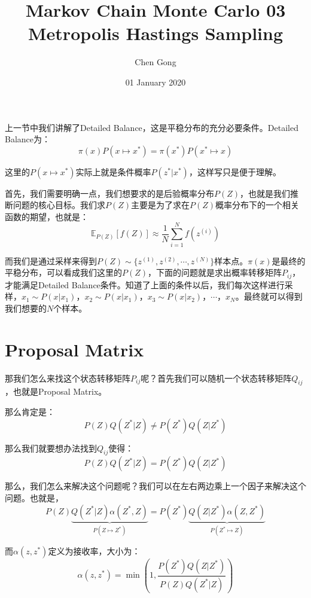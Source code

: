 \documentclass[a4paper]{article}
\title{Markov Chain Monte Carlo 03 Metropolis Hastings Sampling}
\author{Chen Gong}
\date{01 January 2020}
\begin{document}
\maketitle
上一节中我们讲解了Detailed Balance，这是平稳分布的充分必要条件。Detailed Balance为：
\begin{equation}
    \pi(x)P(x\mapsto x^\ast) = \pi(x^\ast)P(x^\ast \mapsto x)
\end{equation}

这里的$P(x\mapsto x^\ast)$实际上就是条件概率$P(z^\ast|x^\ast)$，这样写只是便于理解。

首先，我们需要明确一点，我们想要求的是后验概率分布$P(Z)$，也就是我们推断问题的核心目标。我们求$P(Z)$主要是为了求在$P(Z)$概率分布下的一个相关函数的期望，也就是：
\begin{equation}
    \mathbb{E}_{P(Z)}[f(Z)] \approx \frac{1}{N} \sum_{i=1}^N f(z^{(i)})
\end{equation}

而我们是通过采样来得到$P(Z) \sim \{ z^{(1)},z^{(2)},\cdots, z^{(N)} \}$样本点。$\pi(x)$是最终的平稳分布，可以看成我们这里的$P(Z)$，下面的问题就是求出概率转移矩阵$P_{ij}$，才能满足Detailed Balance条件。知道了上面的条件以后，我们每次这样进行采样，$x_1\sim P(x|x_1)$，$x_2\sim P(x|x_1)$，$x_3\sim P(x|x_2)$，$\cdots$，$x_N$。最终就可以得到我们想要的$N$个样本。

\section{Proposal Matrix}
那我们怎么来找这个状态转移矩阵$P_{ij}$呢？首先我们可以随机一个状态转移矩阵$Q_{ij}$，也就是Proposal Matrix。

那么肯定是：
\begin{equation}
    P(Z)Q(Z^\ast|Z)  \neq P(Z^\ast)Q(Z|Z^\ast)
\end{equation}

那么我们就要想办法找到$Q_{ij}$使得：
\begin{equation}
    P(Z)Q(Z^\ast|Z)  = P(Z^\ast)Q(Z|Z^\ast)
\end{equation}

那么，我们怎么来解决这个问题呢？我们可以在左右两边乘上一个因子来解决这个问题。也就是，
\begin{equation}
    P(Z)\underbrace{Q(Z^\ast|Z)\alpha(Z^\ast,Z)}_{P(Z\mapsto Z^\ast)}  = P(Z^\ast)\underbrace{Q(Z|Z^\ast)\alpha(Z,Z^\ast)}_{P(Z^\ast\mapsto Z)}
\end{equation}

而$\alpha(z,z^\ast)$定义为接收率，大小为：
\begin{equation}
    \alpha(z,z^\ast) 
    = \min \left( 1, \frac{P(Z^\ast)Q(Z|Z^\ast)}{P(Z)Q(Z^\ast|Z)}  \right)
\end{equation}
\end{document}
